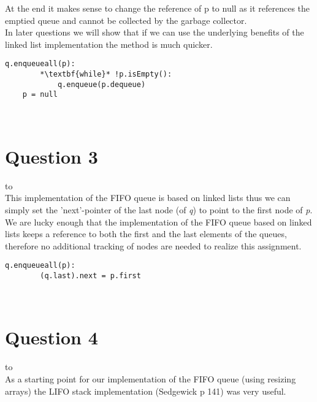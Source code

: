 \documentclass[a4paper]{article}
\def\headline#1{\hbox to \hsize{\hrulefill\quad\lower.3em\hbox{#1}\quad\hrulefill}}
\begin{document}
\noindent
At the end it makes sense to change the reference of p to null as it references the emptied queue and cannot be collected by the garbage collector. 
\ \\

\noindent
In later questions we will show that if we can use the underlying benefits of the linked list implementation the method is much quicker.
 \\

\noindent

\begin{lstlisting}[escapeinside={{*}{*}}]
    q.enqueueall(p):
        *\textbf{while}* !p.isEmpty():
            q.enqueue(p.dequeue)
    p = null
\end{lstlisting}

\ \\
\section*{Question 3}
\headline{-} \ \\
This implementation of the FIFO queue is based on linked lists thus we can simply set the 
'next'-pointer of the last node (of \textit{q}) to point to the first node of \textit{p}.
\\

\noindent
We are lucky enough that the implementation of the FIFO queue based on linked lists keeps a reference to both the first and the last elements of the queues, therefore no additional tracking of nodes are needed to realize this assignment.
 \\

\noindent

\begin{lstlisting}[escapeinside={{*}{*}}]
    q.enqueueall(p):
        (q.last).next = p.first
\end{lstlisting}
 
\ \\

\newpage
\section*{Question 4}
\headline{-} \ \\

\noindent
As a starting point for our implementation of the FIFO queue (using resizing arrays) the LIFO stack implementation (Sedgewick p 141) was very useful.
\ \\
\end{document}
